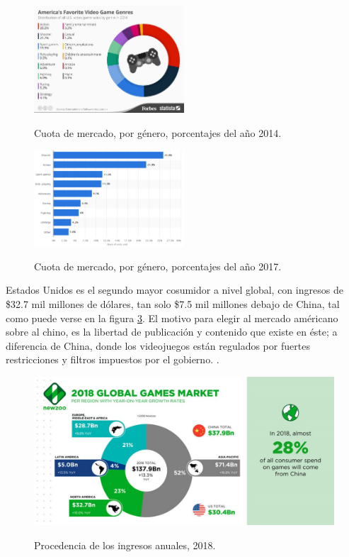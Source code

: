 \documentclass[]{article}
\begin{document}
\begin{figure}[H]
	
	\centering
	\includegraphics[width=0.5\textwidth]{Picture1}
	\caption{Cuota de mercado, por g\'enero, porcentajes del a\~no 2014.} 
	\label{fig:FORB}
	\cite{Forbes}
	
	
\end{figure}

\begin{figure}[H]
	
	\centering
	\includegraphics[width=0.5\textwidth]{statista-2}
	\caption{Cuota de mercado, por g\'enero, porcentajes del a\~no 2017.  } 
	\label{fig:STAT}
	\cite{Statista}
	
	
\end{figure}

Estados Unidos es el segundo mayor cosumidor a nivel global, con ingresos de \$32.7 mil millones de d\'olares, tan solo \$7.5 mil millones debajo de China, tal como puede verse en la figura \ref{NWZOO}.
El motivo para elegir al mercado am\'ericano sobre al chino, es la libertad de publicaci\'on y contenido que existe en \'este; a diferencia de China, donde los videojuegos est\'an regulados por fuertes restricciones y filtros impuestos por el gobierno. \cite{china1}.

\begin{figure}[H]
	
	\centering
	\includegraphics[width=1\textwidth]{GGM2}
	\caption{Procedencia de los ingresos anuales, 2018.  } \cite{Newzoo} 
	\label{NWZOO}
	
\end{figure}
\end{document}
